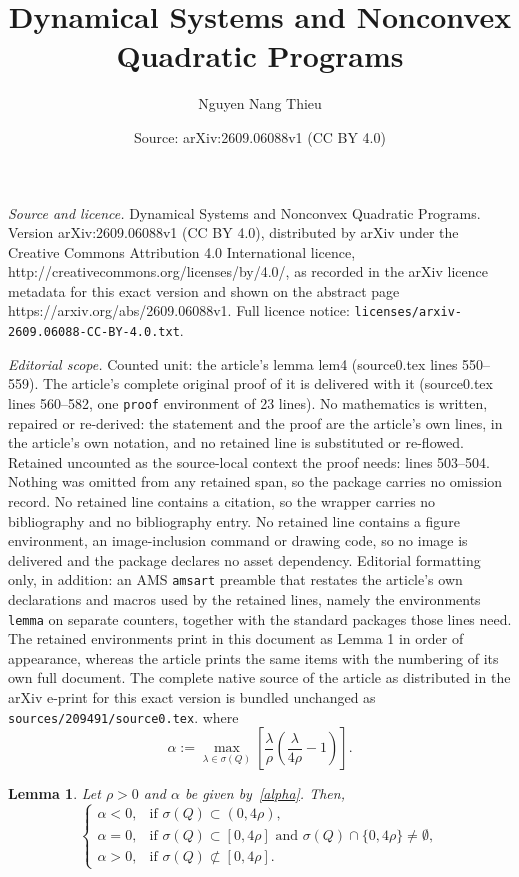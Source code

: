 \documentclass[10pt,a4paper]{amsart}
\title{Dynamical Systems and Nonconvex Quadratic Programs}
\author{Nguyen Nang Thieu}
\date{Source: arXiv:2609.06088v1 (CC BY 4.0)}
\newtheorem{lemma}{Lemma}
\begin{document}
\maketitle

\noindent\emph{Source and licence.} Dynamical Systems and Nonconvex Quadratic Programs. Version arXiv:2609.06088v1 (CC BY 4.0), distributed by arXiv under the Creative Commons Attribution 4.0 International licence, http://creativecommons.org/licenses/by/4.0/, as recorded in the arXiv licence metadata for this exact version and shown on the abstract page https://arxiv.org/abs/2609.06088v1. Full licence notice: \texttt{licenses/arxiv-2609.06088-CC-BY-4.0.txt}.\par\smallskip

\noindent\textit{Editorial scope.} Counted unit: the article's lemma lem4 (source0.tex lines 550--559). The article's complete original proof of it is delivered with it (source0.tex lines 560--582, one \texttt{proof} environment of 23 lines). No mathematics is written, repaired or re-derived: the statement and the proof are the article's own lines, in the article's own notation, and no retained line is substituted or re-flowed.  Retained uncounted as the source-local context the proof needs: lines 503--504.  Nothing was omitted from any retained span, so the package carries no omission record.  No retained line contains a citation, so the wrapper carries no bibliography and no bibliography entry.  No retained line contains a figure environment, an image-inclusion command or drawing code, so no image is delivered and the package declares no asset dependency.  Editorial formatting only, in addition: an AMS \texttt{amsart} preamble that restates the article's own declarations and macros used by the retained lines, namely the environments \texttt{lemma} on separate counters, together with the standard packages those lines need.  The retained environments print in this document as Lemma 1 in order of appearance, whereas the article prints the same items with the numbering of its own full document.  The complete native source of the article as distributed in the arXiv e-print for this exact version is bundled unchanged as \texttt{sources/209491/source0.tex}.
where \begin{equation}\label{alpha}\alpha := \max\limits_{\lambda \in \sigma(Q)} \left[ \frac{\lambda}{\rho} \left( \frac{\lambda}{4\rho} - 1 \right)\right].
\end{equation}

\begin{lemma}\label{lem4}
	Let $\rho>0$ and $\alpha$ be given by~\eqref{alpha}. Then,
$$
	\begin{cases}
		\alpha <0, & \text{if } \sigma(Q)\subset(0,4\rho),\\[2mm]
		\alpha =0, & \text{if } \sigma(Q)\subset[0,4\rho] \text{ and } \sigma(Q)\cap\{0,4\rho\}\neq\emptyset,\\[2mm]
		\alpha >0, & \text{if } \sigma(Q)\not\subset[0,4\rho].
	\end{cases}
$$
\end{lemma}
\end{document}
